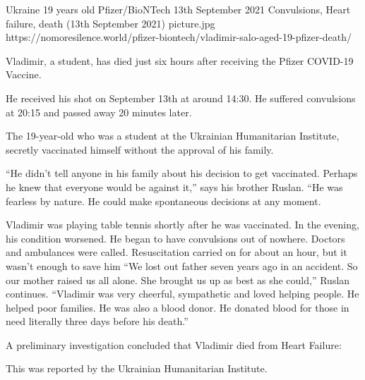 {Ukraine}
{19 years old}
{Pfizer/BioNTech}
{13th September 2021}
{Convulsions, Heart failure, death (13th September 2021)}
{picture.jpg}
{https://nomoresilence.world/pfizer-biontech/vladimir-salo-aged-19-pfizer-death/}
{

Vladimir, a student, has died just six hours after receiving the Pfizer COVID-19
Vaccine.

He received his shot on September 13th at around 14:30. He suffered convulsions
at 20:15 and passed away 20 minutes later.

The 19-year-old who was a student at the Ukrainian Humanitarian Institute,
secretly vaccinated himself without the approval of his family.

“He didn’t tell anyone in his family about his decision to get
vaccinated. Perhaps he knew that everyone would be against it,” says his brother
Ruslan. “He was fearless by nature. He could make spontaneous decisions at any
moment.

Vladimir was playing table tennis shortly after he was vaccinated. In the
evening, his condition worsened. He began to have convulsions out of
nowhere. Doctors and ambulances were called. Resuscitation carried on for about
an hour, but it wasn’t enough to save him “We lost out father seven years ago in
an accident. So our mother raised us all alone. She brought us up as best as she
could,” Ruslan continues. “Vladimir was very cheerful, sympathetic and loved
helping people. He helped poor families. He was also a blood donor. He donated
blood for those in need literally three days before his death.”

A preliminary investigation concluded that Vladimir died from Heart Failure:

This was reported by the Ukrainian Humanitarian Institute.

}
